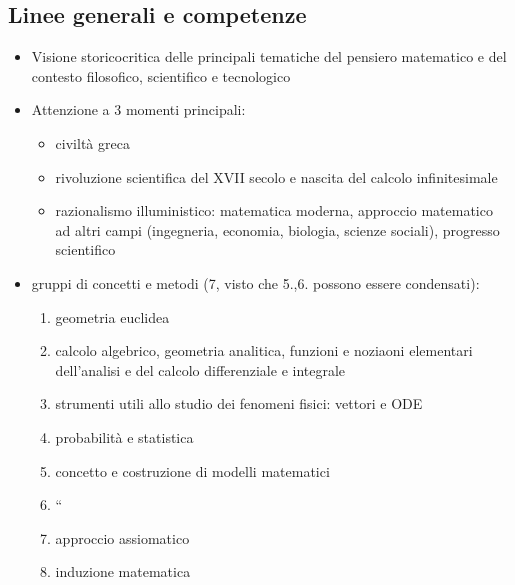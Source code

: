 \documentclass[letterpaper,10pt,english]{jupyterBook}
\begin{document}
\subsection{Linee generali e competenze}
\label{\detokenize{ch/school-programs/current-guidelines-italy:linee-generali-e-competenze}}\begin{itemize}
\item {} 
\sphinxAtStartPar
Visione storico\sphinxhyphen{}critica delle principali tematiche del pensiero matematico e del contesto filosofico, scientifico e tecnologico

\item {} 
\sphinxAtStartPar
Attenzione a 3 momenti principali:
\begin{itemize}
\item {} 
\sphinxAtStartPar
civiltà greca

\item {} 
\sphinxAtStartPar
rivoluzione scientifica del XVII secolo e nascita del calcolo infinitesimale

\item {} 
\sphinxAtStartPar
razionalismo illuministico: matematica moderna, approccio matematico ad altri campi (ingegneria, economia, biologia, scienze sociali), progresso scientifico

\end{itemize}

\item {} 
 gruppi di concetti e metodi (7, visto che 5.,6. possono essere condensati):
\begin{enumerate}
%
\item {} 
\sphinxAtStartPar
geometria euclidea

\item {} 
\sphinxAtStartPar
calcolo algebrico, geometria analitica, funzioni e noziaoni elementari dell’analisi e del calcolo differenziale e integrale

\item {} 
\sphinxAtStartPar
strumenti utili allo studio dei fenomeni fisici: vettori e ODE

\item {} 
\sphinxAtStartPar
probabilità e statistica

\item {} 
\sphinxAtStartPar
concetto e costruzione di modelli matematici

\item {} 
\sphinxAtStartPar
“

\item {} 
\sphinxAtStartPar
approccio assiomatico

\item {} 
\sphinxAtStartPar
induzione matematica

\end{enumerate}

\end{itemize}
\end{document}

